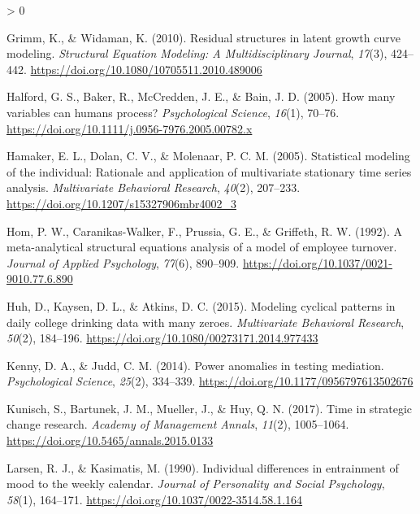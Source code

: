 \documentclass[
12pt, %
twoside,
english]{guelphthesis}
\newlength{\cslhangindent}
\newenvironment{CSLReferences}[2] %
 {%
  \setlength{\parindent}{0pt}
  \ifodd #1 \everypar{\setlength{\hangindent}{\cslhangindent}}\ignorespaces\fi
  \ifnum #2 > 0
  \setlength{\parskip}{\linespacing{2}}
  \fi
 }%
 {}
\begin{document}
\begin{CSLReferences}{1}{0}
\leavevmode{}%
Grimm, K., \& Widaman, K. (2010). Residual structures in latent growth curve modeling. \emph{Structural Equation Modeling: A Multidisciplinary Journal}, \emph{17}(3), 424--442. \url{https://doi.org/10.1080/10705511.2010.489006}

\leavevmode{}%
Halford, G. S., Baker, R., McCredden, J. E., \& Bain, J. D. (2005). How many variables can humans process? \emph{Psychological Science}, \emph{16}(1), 70--76. \url{https://doi.org/10.1111/j.0956-7976.2005.00782.x}

\leavevmode{}%
Hamaker, E. L., Dolan, C. V., \& Molenaar, P. C. M. (2005). Statistical modeling of the individual: Rationale and application of multivariate stationary time series analysis. \emph{Multivariate Behavioral Research}, \emph{40}(2), 207--233. \url{https://doi.org/10.1207/s15327906mbr4002_3}

\leavevmode{}%
Hom, P. W., Caranikas-Walker, F., Prussia, G. E., \& Griffeth, R. W. (1992). A meta-analytical structural equations analysis of a model of employee turnover. \emph{Journal of Applied Psychology}, \emph{77}(6), 890--909. \url{https://doi.org/10.1037/0021-9010.77.6.890}

\leavevmode{}%
Huh, D., Kaysen, D. L., \& Atkins, D. C. (2015). Modeling cyclical patterns in daily college drinking data with many zeroes. \emph{Multivariate Behavioral Research}, \emph{50}(2), 184--196. \url{https://doi.org/10.1080/00273171.2014.977433}

\leavevmode{}%
Kenny, D. A., \& Judd, C. M. (2014). Power anomalies in testing mediation. \emph{Psychological Science}, \emph{25}(2), 334--339. \url{https://doi.org/10.1177/0956797613502676}

\leavevmode{}%
Kunisch, S., Bartunek, J. M., Mueller, J., \& Huy, Q. N. (2017). Time in strategic change research. \emph{Academy of Management Annals}, \emph{11}(2), 1005--1064. \url{https://doi.org/10.5465/annals.2015.0133}

\leavevmode{}%
Larsen, R. J., \& Kasimatis, M. (1990). Individual differences in entrainment of mood to the weekly calendar. \emph{Journal of Personality and Social Psychology}, \emph{58}(1), 164--171. \url{https://doi.org/10.1037/0022-3514.58.1.164}


\end{CSLReferences}
\end{document}
